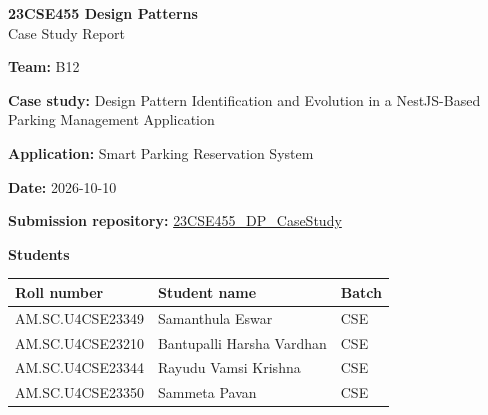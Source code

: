\documentclass[11pt,a4paper]{article}
\begin{document}
\begin{center}\Large\textbf{23CSE455 Design Patterns}\\[4pt]\LARGE Case Study Report\end{center}

\textbf{Team:} B12\par
\textbf{Case study:} Design Pattern Identification and Evolution in a NestJS-Based Parking Management Application\par
\textbf{Application:} Smart Parking Reservation System\par
\textbf{Date:} 2026-10-10\par
\textbf{Submission repository:} \href{https://github.com/aswathymohan-amrita/23CSE455_DP_CaseStudy}{23CSE455\_DP\_CaseStudy}\par

\textbf{Students}\par
\begin{tabularx}{\linewidth}{@{}llX@{}}\toprule
Roll number & Student name & Batch\\\midrule
AM.SC.U4CSE23349 & Samanthula Eswar & CSE\\
AM.SC.U4CSE23210 & Bantupalli Harsha Vardhan & CSE\\
AM.SC.U4CSE23344 & Rayudu Vamsi Krishna & CSE\\
AM.SC.U4CSE23350 & Sammeta Pavan & CSE\\\bottomrule
\end{tabularx}

\begin{abstract}
This report studies the design patterns present in the \emph{Smart Parking
Reservation System}, a NestJS/TypeORM backend with a Next.js/React frontend,
inspected at baseline commit \texttt{940daee}. Part~1 reports a baseline
candidate set of four confirmed pattern categories comprising seven recorded
instances: the Strategy pattern (GoF, behavioural; 1 instance) and three
architectural patterns --- Repository (4 instances), Dependency Injection /
Inversion of Control (1 instance) and Layered Architecture (1 instance).
Part~2 implements three evolution changes on top of the baseline --- dynamic
slot allocation (a second Strategy instance), EV charging (introducing the
\textbf{State} pattern) and real-time occupancy monitoring (introducing the
\textbf{Observer} pattern) --- each captured as a sequential diff and covered by
passing tests. Part~3 compares all six confirmed pattern types ---
\textbf{Strategy}, \textbf{State}, \textbf{Observer}, \textbf{Repository},
\textbf{Dependency Injection} and \textbf{Layered Architecture} --- across
JavaScript, Python, Java and C++ on lines of code, cyclomatic complexity and
process runtime.
\end{abstract}
\end{document}
